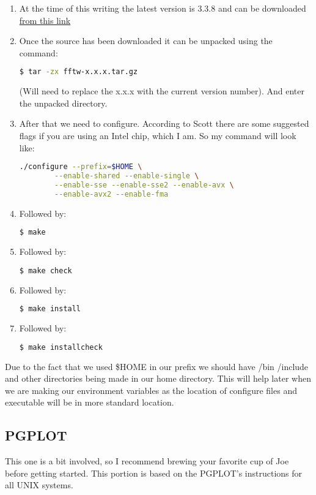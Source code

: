 \documentclass{article}
\begin{document}
    
    \begin{enumerate}
    	\item At the time of this writing the latest version is 3.3.8 and can be downloaded \href{http://www.fftw.org/download.html}{from this link}
    	\item \noindent Once the source has been downloaded it can be unpacked using the command:
	    \begin{lstlisting}[language=bash]
	    $ tar -zx fftw-x.x.x.tar.gz 
	    \end{lstlisting}
    	(Will need to replace the x.x.x with the current version number). And enter the unpacked directory.
    	\item \noindent After that we need to configure. According to Scott there are some suggested flags if you are
    	using an Intel chip, which I am. So my command will look like: 
	    \begin{lstlisting}[language=bash]
	    ./configure --prefix=$HOME \
	    --enable-shared --enable-single \
	    --enable-sse --enable-sse2 --enable-avx \
	    --enable-avx2 --enable-fma
	    \end{lstlisting}
	    \item \noindent Followed by: \begin{lstlisting}[language=bash]
	    $ make
	    \end{lstlisting}
	    \item \noindent Followed by: 
		\begin{lstlisting}[language=bash]
		$ make check
		\end{lstlisting}
	    \item \noindent Followed by: 
		\begin{lstlisting}[language=bash]
		$ make install
		\end{lstlisting}
	    \item \noindent Followed by:
		\begin{lstlisting}[language=bash]
		 $ make installcheck
		\end{lstlisting}
    	\end{enumerate}
    	Due to the fact that we used \$HOME in our prefix we should have /bin /include and other directories
    	being made in our home directory. This will help later when we are making our environment variables
    	as the location of configure files and executable will be in more standard location.
    
    	\subsection{PGPLOT}
    	This one is a bit involved, so I recommend brewing your favorite cup of Joe before getting started. This
    	portion is based on the PGPLOT’s instructions for all UNIX systems. 
    	
\end{document}
